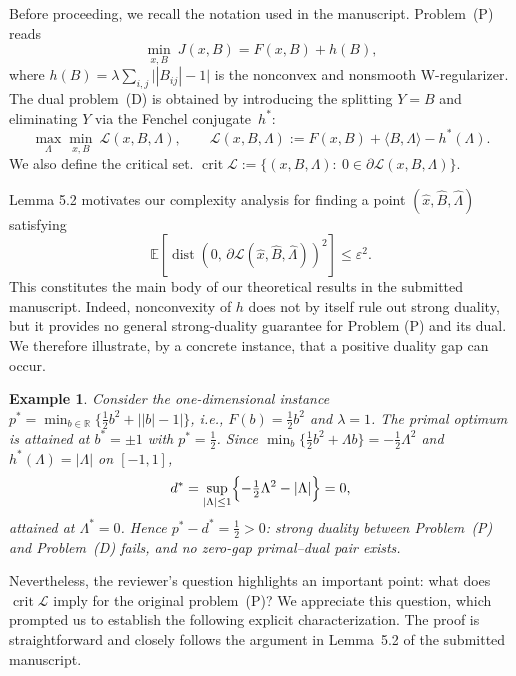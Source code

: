 \documentclass[11pt]{article}
\newtheorem{example}{Example}
\begin{document}
Before proceeding, we recall the
notation used in the manuscript. Problem~(P) reads
\[
\tag{P}
\min_{x,B}\ J(x,B)=F(x,B)+h(B),
\]
where $h(B)=\lambda\sum_{i,j}\bigl||B_{ij}|-1\bigr|$ is the nonconvex and
nonsmooth W-regularizer.
The dual problem~(D) is obtained by introducing the splitting $Y=B$
and eliminating $Y$ via the Fenchel conjugate~$h^*$:
\[
\max_{\Lambda}\min_{x,B}\
\mathcal{L}(x,B,\Lambda),\qquad
\mathcal{L}(x,B,\Lambda)
:=F(x,B)+\langle B,\Lambda\rangle-h^*(\Lambda).
\tag{D}
\]
We also define the critical set.
\(
\operatorname{crit}\mathcal{L}
:=\bigl\{(x,B,\Lambda):\
0\in\partial\mathcal{L}(x,B,\Lambda)\bigr\}.
\)

Lemma 5.2 motivates our complexity analysis for finding a point
$(\hat x,\widehat B,\widehat\Lambda)$ satisfying 
\[
\mathbb{E}[\operatorname{dist}(0,\,\partial\mathcal{L}(\hat x,\widehat B,\widehat\Lambda))^2]\le\varepsilon^2.
\]
This constitutes the main body of our theoretical results in the submitted manuscript. 
Indeed, nonconvexity of $h$ does not by itself rule out strong duality, but it
provides no general strong-duality guarantee for Problem (P) and its dual.
We therefore illustrate, by a concrete instance, that a positive duality gap
can occur.

\begin{example}\label{ex:gap}
Consider the one-dimensional instance
$p^* = \min_{b\in\mathbb{R}}\bigl\{\tfrac12 b^2+\bigl||b|-1\bigr|\bigr\}$,
i.e., $F(b)=\tfrac12 b^2$ and $\lambda=1$. The primal optimum is attained at
$b^*=\pm1$ with $p^*=\tfrac12$. Since
$\min_b\{\tfrac12 b^2+\Lambda b\}=-\tfrac12\Lambda^2$ and
$h^*(\Lambda)=|\Lambda|$ on $[-1,1]$,
\[
d^*=\sup_{|\Lambda|\le1}\Bigl\{-\tfrac12\Lambda^2-|\Lambda|\Bigr\}=0,
\]
attained at $\Lambda^*=0$. Hence $p^*-d^*=\tfrac12>0$: strong duality
between Problem~(P) and Problem~(D) fails, and no zero-gap primal--dual pair exists.
\end{example}

Nevertheless, the reviewer's question highlights an important point: what does $\operatorname{crit}\mathcal{L}$ imply for the 
original problem~\textup{(P)}? We appreciate this question, which prompted
us to establish the following explicit characterization. The proof is straightforward and closely follows the argument in Lemma~5.2 of the submitted manuscript.
\end{document}
